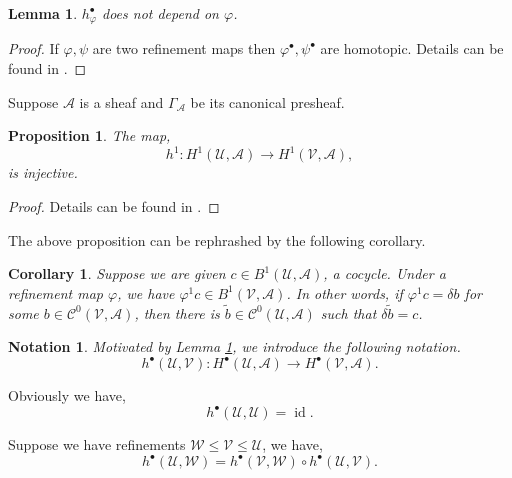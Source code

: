 \documentclass{article}
\newtheorem{proposition}{Proposition}[section]
\newtheorem{lemma}{Lemma}[section]
\newtheorem{notation}{Notation}[section]
\newtheorem{corollary}{Corollary} [section]
\DeclareMathOperator{\id}{id}
\newcommand{\cA}[0]{\mathcal{A}}
\newcommand{\cC}[0]{\mathcal{C}}
\newcommand{\sU}[0]{\mathscr{U}}
\newcommand{\sV}[0]{\mathscr{V}}
\begin{document}
\begin{lemma}
  $h_\varphi^\bullet$ does not depend on $\varphi$. 
  \label{lemma_refinement_cech_universal}
\end{lemma}
\begin{proof}
  If $\varphi,\psi$ are two refinement maps then $\varphi^\bullet,\psi^\bullet$ are homotopic. Details can be found in \cite{Hir}.
\end{proof}
Suppose $\cA$ is a sheaf and $\Gamma_\cA$ be its canonical presheaf. 
\begin{proposition}
  The map,
  \begin{equation*}
    h^1:H^1(\sU,\cA)\to H^1(\sV,\cA),
  \end{equation*}
  is injective.
\end{proposition}

\begin{proof}
  Details can be found in \cite{Hom}.
\end{proof}
The above proposition can be rephrashed by the following corollary.
\begin{corollary}
  Suppose we are given $c\in B^1(\sU,\cA)$, a cocycle. Under a refinement map $\varphi$, we have $\varphi^1c\in B^1(\sV,\cA)$. In other words, if $\varphi^1c=\delta b$ for some $b\in\cC^0(\sV,\cA)$, then there is $\tilde{b}\in\cC^0(\sU,\cA)$ such that $\delta\tilde{b}=c$.
\end{corollary}

\begin{notation}
  Motivated by Lemma \ref{lemma_refinement_cech_universal}, we introduce the following notation.
  \begin{equation*}
    h^\bullet(\sU,\sV):H^\bullet(\sU,\cA)\to H^\bullet(\sV,\cA).
  \end{equation*}
\end{notation}

Obviously we have,
\begin{equation*}
  h^\bullet(\sU,\sU) = \id.
\end{equation*}

Suppose we have refinements $\mathscr{W}\leq \sV\leq \sU$, we have,
\begin{equation*}
  h^\bullet(\sU,\mathscr{W}) = h^\bullet(\sV,\mathscr{W})\circ h^\bullet(\sU,\sV).
\end{equation*}
\end{document}
